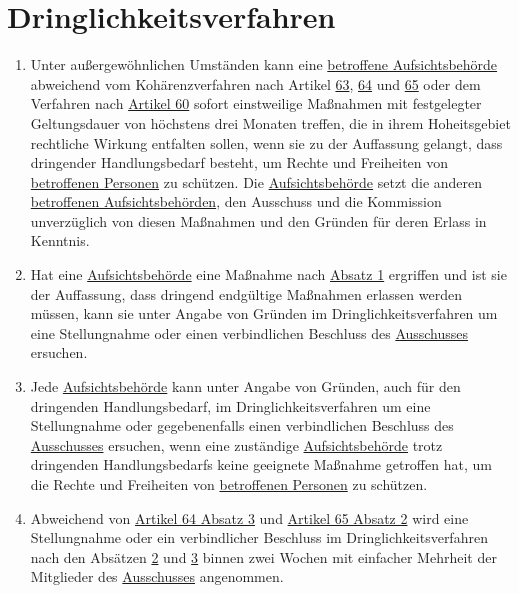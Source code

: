 \chapter{Dringlichkeitsverfahren}
\label{ch:66}


\begin{enumerate}

  \item Unter außergewöhnlichen Umständen kann eine \hyperref[itm:04-22]{betroffene Aufsichtsbehörde} abweichend vom
   Kohärenzverfahren nach Artikel \hyperref[ch:63]{63}, \hyperref[ch:64]{64} und \hyperref[ch:65]{65} oder dem
   Verfahren nach \hyperref[ch:60]{Artikel 60} sofort einstweilige Maßnahmen mit festgelegter Geltungsdauer von
   höchstens drei Monaten treffen, die in ihrem Hoheitsgebiet rechtliche Wirkung entfalten sollen, wenn sie zu der
   Auffassung gelangt, dass dringender Handlungsbedarf besteht, um Rechte und Freiheiten von \hyperref[itm:04-1]
   {betroffenen Personen} zu schützen. Die \hyperref[itm:04-21]{Aufsichtsbehörde} setzt die anderen \hyperref
   [itm:04-22]{betroffenen Aufsichtsbehörden}, den Ausschuss und die Kommission unverzüglich von diesen Maßnahmen und
   den Gründen für deren Erlass in Kenntnis.%
  \label{itm:66-1}

  \item Hat eine \hyperref[itm:04-21]{Aufsichtsbehörde} eine Maßnahme nach \hyperref[itm:66-1]{Absatz 1} ergriffen und
   ist sie der Auffassung, dass dringend endgültige Maßnahmen erlassen werden müssen, kann sie unter Angabe von Gründen
   im Dringlichkeitsverfahren um eine Stellungnahme oder einen verbindlichen Beschluss des \hyperref[ch:68]{Ausschusses} ersuchen.%
  \label{itm:66-2}

  \item Jede \hyperref[itm:04-21]{Aufsichtsbehörde} kann unter Angabe von Gründen, auch für den dringenden
   Handlungsbedarf, im Dringlichkeitsverfahren um eine Stellungnahme oder gegebenenfalls einen verbindlichen Beschluss
   des \hyperref[ch:68]{Ausschusses} ersuchen, wenn eine zuständige \hyperref[itm:04-21]{Aufsichtsbehörde} trotz dringenden
   Handlungsbedarfs keine geeignete Maßnahme getroffen hat, um die Rechte und Freiheiten von \hyperref[itm:04-1]
   {betroffenen Personen} zu schützen.%
  \label{itm:66-3}

  \item Abweichend von \hyperref[itm:64-3]{Artikel 64 Absatz 3} und \hyperref[itm:65-2]{Artikel 65 Absatz 2} wird eine
   Stellungnahme oder ein verbindlicher Beschluss im Dringlichkeitsverfahren nach den Absätzen \hyperref[itm:66-2]
   {2} und \hyperref[itm:66-3]{3} binnen zwei Wochen mit einfacher Mehrheit der Mitglieder des \hyperref[ch:68]{Ausschusses} angenommen.%
  \label{itm:66-4}

\end{enumerate}


